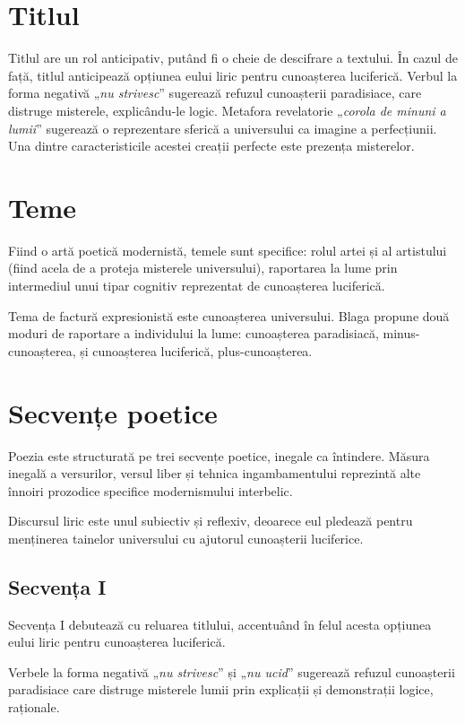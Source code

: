 \documentclass{article}
\newcommand{\qu}[1]{„\emph{#1}”}
\begin{document}
\section{Titlul}
Titlul are un rol anticipativ, putând fi o cheie de descifrare a textului. În cazul de față, titlul anticipează opțiunea eului liric pentru cunoașterea luciferică. Verbul la forma negativă \qu{nu strivesc} sugerează refuzul cunoașterii paradisiace, care distruge misterele, explicându-le logic. Metafora revelatorie \qu{corola de minuni a lumii} sugerează o reprezentare sferică a universului ca imagine a perfecțiunii. Una dintre caracteristicile acestei creații perfecte este prezența misterelor.

\section{Teme}
Fiind o artă poetică modernistă, temele sunt specifice: rolul artei și al artistului (fiind acela de a proteja misterele universului), raportarea la lume prin intermediul unui tipar cognitiv reprezentat de cunoașterea luciferică.

Tema de factură expresionistă este cunoașterea universului. Blaga propune două moduri de raportare a individului la lume: cunoașterea paradisiacă, minus-cunoașterea, și cunoașterea luciferică, plus-cunoașterea.

\section{Secvențe poetice}
Poezia este structurată pe trei secvențe poetice, inegale ca întindere. Măsura inegală a versurilor, versul liber și tehnica ingambamentului reprezintă alte înnoiri prozodice specifice modernismului interbelic.

Discursul liric este unul subiectiv și reflexiv, deoarece eul pledează pentru menținerea tainelor universului cu ajutorul cunoașterii luciferice.

\subsection{Secvența I}
Secvența I debutează cu reluarea titlului, accentuând în felul acesta opțiunea eului liric pentru cunoașterea luciferică.

Verbele la forma negativă \qu{nu strivesc} și \qu{nu ucid} sugerează refuzul cunoașterii paradisiace care distruge misterele lumii prin explicații și demonstrații logice, raționale.
\end{document}
